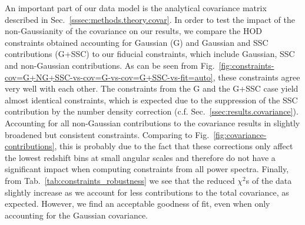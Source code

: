 \documentclass[a4paper,11pt]{article}
\begin{document}
An important part of our data model is the analytical covariance matrix described in Sec.~\ref{sssec:methods.theory.covar}. In order to test the impact of the non-Gaussianity of the covariance on our results, we compare the HOD constraints obtained accounting for Gaussian (G) and Gaussian and SSC contributions (G+SSC) to our fiducial constraints, which include Gaussian, SSC and non-Gaussian contributions. As can be seen from Fig.~\ref{fig:constraints-cov=G+NG+SSC-vs-cov=G-vs-cov=G+SSC-vs-fit=auto}, these constraints agree very well with each other. The constraints from the G and the G+SSC case yield almost identical constraints, which is expected due to the suppression of the SSC contribution by the number density correction (c.f. Sec.~\ref{ssec:results.covariance}). Accounting for all non-Gaussian contributions to the covariance results in slightly broadened but consistent constraints. Comparing to Fig.~\ref{fig:covariance-contributions}, this is probably due to the fact that these corrections only affect the lowest redshift bins at small angular scales and therefore do not have a significant impact when computing constraints from all power spectra. Finally, from Tab.~\ref{tab:constraints_robustness} we see that the reduced $\chi^{2}$s of the data slightly increase as we account for less contributions to the total covariance, as expected. However, we find an acceptable goodness of fit, even when only accounting for the Gaussian covariance.
\end{document}
